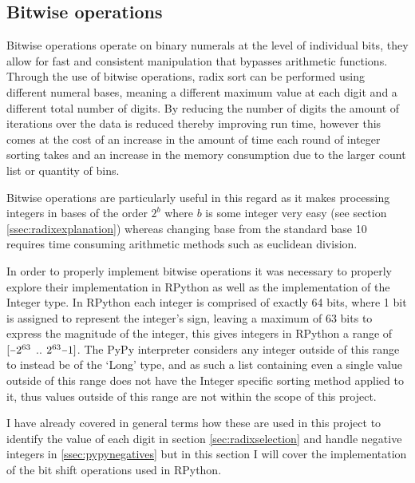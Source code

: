\documentclass[12pt]{article}
\newcommand{\minus}{\scalebox{0.75}[1.0]{$-$}}
\begin{document}
\subsection{Bitwise operations}
\label{ssec:bitwise}
Bitwise operations operate on binary numerals at the level of individual bits, they allow for fast and consistent manipulation that bypasses arithmetic functions. Through the use of bitwise operations, radix sort can be performed using different numeral bases, meaning a different maximum value at each digit and a different total number of digits. By reducing the number of digits the amount of iterations over the data is reduced thereby improving run time, however this comes at the cost of an increase in the amount of time each round of integer sorting takes and an increase in the memory consumption due to the larger count list or quantity of bins. 
\par
Bitwise operations are particularly useful in this regard as it makes processing integers in bases of the order $2^b$ where $b$ is some integer very easy (see section \ref{ssec:radixexplanation}) whereas changing base from the standard base 10 requires time consuming arithmetic methods such as euclidean division.
\par
In order to properly implement bitwise operations it was necessary to properly explore their implementation in RPython as well as the implementation of the Integer type. In RPython each integer is comprised of exactly 64 bits, where 1 bit is assigned to represent the integer's sign, leaving a maximum of 63 bits to express the magnitude of the integer, this gives integers in RPython a range of $[\minus2^{63}$ $..$ $2^{63}\minus1]$. The PyPy interpreter considers any integer outside of this range to instead be of the `Long' type, and as such a list containing even a single value outside of this range does not have the Integer specific sorting method applied to it, thus values outside of this range are not within the scope of this project.
\par
I have already covered in general terms how these  are used in this project to identify the value of each digit in section \ref{sec:radixselection} and handle negative integers in \ref{ssec:pypynegatives} but in this section I will cover the implementation of the bit shift operations used in RPython.
\end{document}
